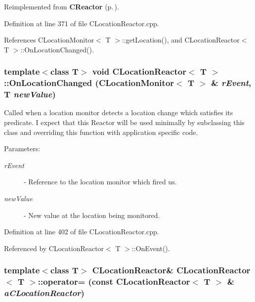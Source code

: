 Reimplemented from {\bf CReactor} {\rm (p.\,\pageref{classCReactor_a6})}.

Definition at line 371 of file CLocation\-Reactor.cpp.

References CLocation\-Monitor$<$ T $>$::get\-Location(), and CLocation\-Reactor$<$ T $>$::On\-Location\-Changed().
\subsubsection{\setlength{\rightskip}{0pt plus 5cm}template$<$class T$>$ void CLocation\-Reactor$<$ T $>$::On\-Location\-Changed ({\bf CLocation\-Monitor}$<$ T $>$ \& {\em r\-Event}, T {\em new\-Value})\hspace{0.3cm}{\tt  [virtual]}}\label{classCLocationReactor_a6}


Called when a location monitor detects a location change which satisfies its predicate. I expect that this Reactor will be used minimally by subclassing this class and overriding this function with application specific code.\begin{Desc}
\item[Parameters: ]\par
\begin{description}
\item[{\em 
r\-Event}]- Reference to the location monitor which fired us. \item[{\em 
new\-Value}]- New value at the location being monitored. \end{description}
\end{Desc}


Definition at line 402 of file CLocation\-Reactor.cpp.

Referenced by CLocation\-Reactor$<$ T $>$::On\-Event().
\subsubsection{\setlength{\rightskip}{0pt plus 5cm}template$<$class T$>$ CLocation\-Reactor\& CLocation\-Reactor$<$ T $>$::operator= (const CLocation\-Reactor$<$ T $>$ \& {\em a\-CLocation\-Reactor})\hspace{0.3cm}{\tt  [private]}}\label{classCLocationReactor_c1}


